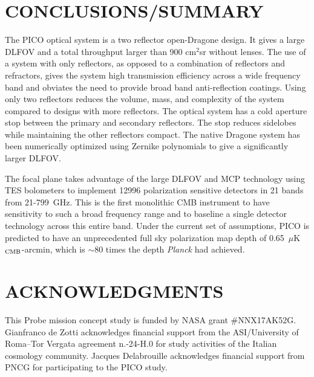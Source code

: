 \documentclass[]{spie}  %
\begin{document}
\section{CONCLUSIONS/SUMMARY}

The PICO optical system is a two reflector open-Dragone design. It gives a large DLFOV and a total 
throughput larger than 900 cm$^{2}$sr without lenses. The use of a system 
with only reflectors, as opposed to a combination of reflectors and refractors, gives the system high transmission efficiency 
across a wide frequency band and obviates the need to provide broad band anti-reflection coatings. 
Using only two reflectors reduces the volume, mass, and complexity of the system compared to designs with more 
reflectors. The optical system has a cold aperture stop between the primary and secondary reflectors. The stop 
reduces sidelobes while maintaining the other reflectors compact. The native Dragone system has been 
numerically optimized using Zernike polynomials to give a significantly larger DLFOV. 

The focal plane takes advantage of the large DLFOV and MCP 
technology using TES bolometers to implement 12996 polarization sensitive detectors in 21 bands from 21-799~GHz. 
This is the first monolithic CMB instrument to have sensitivity to such a broad frequency range and to baseline a single detector technology 
across this entire band. Under the current set of assumptions, PICO is predicted to have an unprecedented full sky polarization 
map depth of 0.65~$\mu$K$_{\rm CMB}$-arcmin, which is $\sim$80 times the depth {\it Planck} had achieved. 






\section{ACKNOWLEDGMENTS}

This Probe mission concept study is funded by NASA grant \#NNX17AK52G.  Gianfranco de Zotti acknowledges financial support from the ASI/University of
Roma--Tor Vergata agreement n.-24-H.0 for study activities of the Italian cosmology community. Jacques
Delabrouille acknowledges financial support from PNCG for participating to the PICO study.


\end{document}
